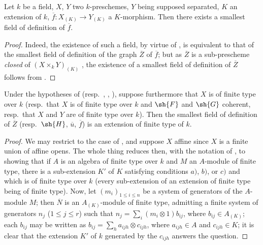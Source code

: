\begin{corollary}[4.8.12]
\label{IV.4.8.12}
Let $k$ be a field, $X$, $Y$ two $k$-preschemes, $Y$ being supposed separated, $K$ an extension of $k$, $\overline{f}:X_{(K)}\to Y_{(K)}$ a $K$-morphism.
Then there exists a smallest field of definition of $\overline{f}$.
\end{corollary}

\begin{proof}
Indeed, the existence of such a field, by virtue of , is equivalent to that of the smallest field of definition of the graph $\overline{Z}$ of $\overline{f}$; but as $\overline{Z}$ is a sub-prescheme \emph{closed} of $(X\times_k Y)_{(K)}$ , the existence of a smallest field of definition of $\overline{Z}$ follows from .
\end{proof}

\begin{proposition}[4.8.13]
\label{IV.4.8.13}
Under the hypotheses of  (resp.\ , , ), suppose furthermore that $X$ is of finite type over $k$ (resp.\ that $X$ is of finite type over $k$ and $\sh{F}$ and $\sh{G}$ coherent, resp.\ that $X$ and $Y$ are of finite type over $k$).
Then the smallest field of definition of $\overline{Z}$ (resp.\ $\sh{H}$, $\overline{u}$, $\overline{f}$) is an extension of finite type of $k$.
\end{proposition}

\begin{proof}
We may restrict to the case of , and suppose $X$ affine since $X$ is a finite union of affine opens.
The whole thing reduces then, with the notation of , to showing that if $A$ is an algebra of finite type over $k$ and $M$ an $A$-module of finite type, there is a sub-extension $K'$ of $K$ satisfying conditions $a)$, $b)$, or $c)$ and which is of finite type over $k$ (every sub-extension of an extension of finite type being of finite type).
Now, let $(m_i)_{1\leq i\leq n}$ be a system of generators of the $A$-module $M$; then $\overline{N}$ is an $A_{(K)}$-module of finite type, admitting a finite system of generators $n_j$ ($1\leq j\leq r$) such that $n_j = \sum_i (m_i\otimes 1)b_{ij}$, where $b_{ij}\in A_{(K)}$; each $b_{ij}$ may be written as $b_{ij} = \sum_h a_{ijh}\otimes c_{ijh}$, where $a_{ijh}\in A$ and $c_{ijh}\in K$; it is clear that the extension $K'$ of $k$ generated by the $c_{ijh}$ answers the question.
\end{proof}

